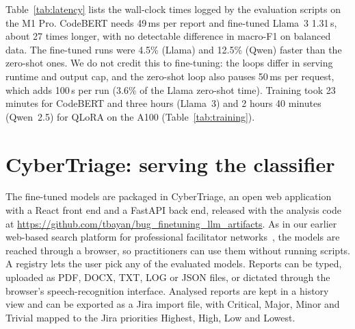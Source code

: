 \documentclass[a4paper,fleqn]{cas-sc}
\newcommand{\coderepo}{\url{https://github.com/tbayan/bug_finetuning_llm_artifacts}}
\begin{document}
Table~\ref{tab:latency} lists the wall-clock times logged by the evaluation scripts on
the M1 Pro. CodeBERT needs 49\,ms per report and fine-tuned Llama~3 1.31\,s, about 27
times longer, with no detectable difference in macro-F1 on balanced data. The
fine-tuned runs were 4.5\% (Llama) and 12.5\% (Qwen) faster than the zero-shot ones.
We do not credit this to fine-tuning: the loops differ in serving runtime and output
cap, and the zero-shot loop also pauses 50\,ms per request, which adds 100\,s per run
(3.6\% of the Llama zero-shot time). Training took 23 minutes for CodeBERT and three hours (Llama~3) and 2 hours
40 minutes (Qwen~2.5) for QLoRA on the A100 (Table~\ref{tab:training}).

\begin{table}[width=\linewidth,cols=5,pos=t]
\caption{Inference wall-clock time on the Apple M1 Pro, from the most recent logged
evaluation runs. The LLM loops also include prompt building and parsing; in the
CodeBERT and LLM loops the first call also loads the model.}
\label{tab:latency}
\small

\end{table}

\section{CyberTriage: serving the classifier}
\label{sec:system}

The fine-tuned models are packaged in CyberTriage, an open web application with a
React front end and a FastAPI back end, released with the analysis code at
\coderepo. As in our earlier web-based search platform for professional facilitator
networks~\citep{bayan2025enhanced}, the models are reached through a browser, so
practitioners can use them without running scripts. A registry lets the user pick any of
the evaluated models. Reports can be typed, uploaded as PDF, DOCX, TXT, LOG or JSON
files, or dictated through the browser's speech-recognition interface. Analysed
reports are kept in a history view and can be exported as a Jira import file, with
Critical, Major, Minor and Trivial mapped to the Jira priorities Highest, High, Low and
Lowest.
\end{document}
